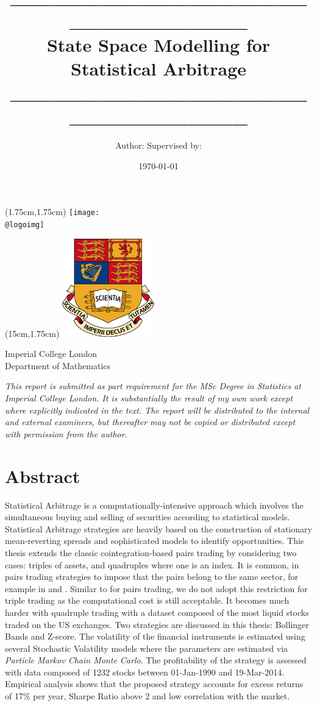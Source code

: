 \documentclass[11pt,a4,twosided,singlespacing,titlepagenumber=on]{scrreprt}
\title{\_\_\_\_\_\_\_\_\_\_\_\_\_\_\_\_\_\_\_\_\_\_\_\_\_\_\_\_\_\_\_\_ \\ State Space Modelling for Statistical Arbitrage \\ \_\_\_\_\_\_\_\_\_\_\_\_\_\_\_\_\_\_\_\_\_\_\_\_\_\_\_\_\_\_\_\_ }
\author{Author: \hfill Supervised by:}
\date{\today}
\makeatletter
\numberwithin{equation}{chapter} %
\theoremstyle{remark}
\renewcommand{\maketitle}{
\begin{titlepage}
\ifdefined\@logoimg
\begin{textblock*}{8cm}(1.75cm,1.75cm)
\texttt{[image: \\@logoimg]}
\end{textblock*}
\vspace*{1cm}

\begin{textblock*}{8cm}(15cm,1.75cm)
\includegraphics[width=40mm]{2000px-Imperial_College_London_crest}
\end{textblock*}
\vspace*{1cm}


\else
\fi
\begin{center}
\vspace*{\stretch{0.1}}
Imperial College London\\
Department of Mathematics\par
\vspace*{\stretch{1}} %
{\titlefont\Huge \@title\par} %
\vspace*{\stretch{2}}
{\large \textit{\@author} \par}
\vspace*{\stretch{0.1}}
{\large \@supervisor \par}
\vspace*{\stretch{3}}
\@date
\vspace*{\stretch{1}}

\end{center}%
\textit{
This report is submitted as part requirement for the MSc Degree in Statistics at Imperial College London. It is substantially the result of my own work except where explicitly indicated in the text. The report will be distributed to the internal and external examiners, but thereafter may not be copied or distributed except with permission from the author.}
\vspace*{\stretch{0.1}}
\end{titlepage}%
}
\renewenvironment{abstract}%
{\chapter*{Abstract}\thispagestyle{plain}}%
{\clearpage}
\makeatother
\begin{document}


\maketitle

\begin{abstract}
Statistical Arbitrage is a computationally-intensive approach which involves the simultaneous buying and selling of securities according to statistical models. Statistical Arbitrage strategies are heavily based on the construction of stationary mean-reverting spreads and sophisticated models to identify opportunities. This thesis extends the classic cointegration-based pairs trading by considering two cases: triples of assets, and quadruples where one is an index. It is common, in pairs trading strategies to impose that the pairs belong to the same sector, for example in \cite{chan2009} and \cite{dunis2010}. Similar to \cite{caldeira2013} for pairs trading, we do not adopt this restriction for triple trading as the computational cost is still acceptable. It becomes much harder with quadruple trading with a dataset composed of the most liquid stocks traded on the US exchanges. Two strategies are discussed in this thesis: Bollinger Bands and Z-score. The volatility of the financial instruments is estimated using several Stochastic Volatility models where the parameters are estimated via \textit{Particle Markov Chain Monte Carlo}. The profitability of the strategy is assessed with data composed of 1232 stocks between 01-Jan-1990 and 19-Mar-2014. Empirical analysis shows that the proposed strategy accounts for excess returns of 17\% per year, Sharpe Ratio above 2 and low correlation with the market.

\end{abstract}


\renewcommand{\contentsname}{Table of Contents}
\tableofcontents

\listoffigures
\listoftables



\end{document}
